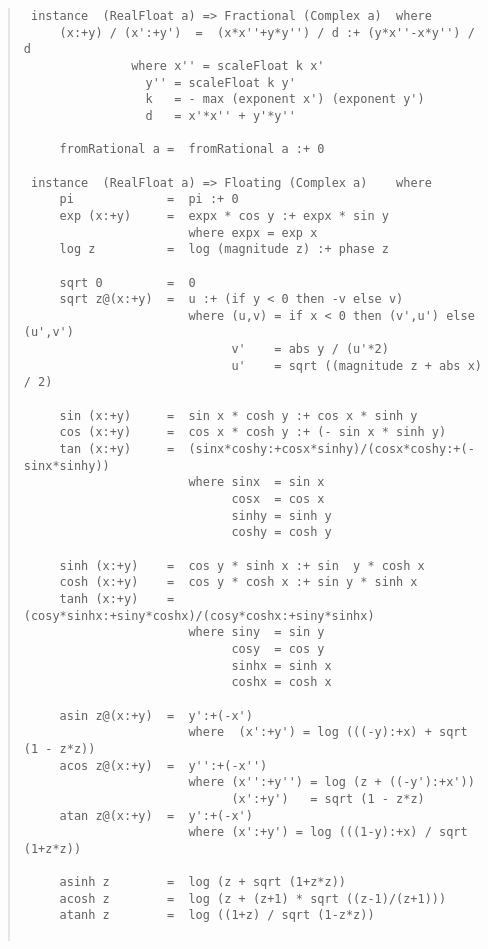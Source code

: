 \begin{quote}
{\begin{verbatim}
 instance  (RealFloat a) => Fractional (Complex a)  where
     (x:+y) / (x':+y')	=  (x*x''+y*y'') / d :+ (y*x''-x*y'') / d
 			   where x'' = scaleFloat k x'
 				 y'' = scaleFloat k y'
 				 k   = - max (exponent x') (exponent y')
 				 d   = x'*x'' + y'*y''
 
     fromRational a	=  fromRational a :+ 0
 
 instance  (RealFloat a) => Floating (Complex a)	where
     pi             =  pi :+ 0
     exp (x:+y)     =  expx * cos y :+ expx * sin y
                       where expx = exp x
     log z          =  log (magnitude z) :+ phase z
 
     sqrt 0         =  0
     sqrt z@(x:+y)  =  u :+ (if y < 0 then -v else v)
                       where (u,v) = if x < 0 then (v',u') else (u',v')
                             v'    = abs y / (u'*2)
                             u'    = sqrt ((magnitude z + abs x) / 2)
 
     sin (x:+y)     =  sin x * cosh y :+ cos x * sinh y
     cos (x:+y)     =  cos x * cosh y :+ (- sin x * sinh y)
     tan (x:+y)     =  (sinx*coshy:+cosx*sinhy)/(cosx*coshy:+(-sinx*sinhy))
                       where sinx  = sin x
                             cosx  = cos x
                             sinhy = sinh y
                             coshy = cosh y
 
     sinh (x:+y)    =  cos y * sinh x :+ sin  y * cosh x
     cosh (x:+y)    =  cos y * cosh x :+ sin y * sinh x
     tanh (x:+y)    =  (cosy*sinhx:+siny*coshx)/(cosy*coshx:+siny*sinhx)
                       where siny  = sin y
                             cosy  = cos y
                             sinhx = sinh x
                             coshx = cosh x
 
     asin z@(x:+y)  =  y':+(-x')
                       where  (x':+y') = log (((-y):+x) + sqrt (1 - z*z))
     acos z@(x:+y)  =  y'':+(-x'')
                       where (x'':+y'') = log (z + ((-y'):+x'))
                             (x':+y')   = sqrt (1 - z*z)
     atan z@(x:+y)  =  y':+(-x')
                       where (x':+y') = log (((1-y):+x) / sqrt (1+z*z))
 
     asinh z        =  log (z + sqrt (1+z*z))
     acosh z        =  log (z + (z+1) * sqrt ((z-1)/(z+1)))
     atanh z        =  log ((1+z) / sqrt (1-z*z))
 
\end{verbatim}}
\end{quote}
